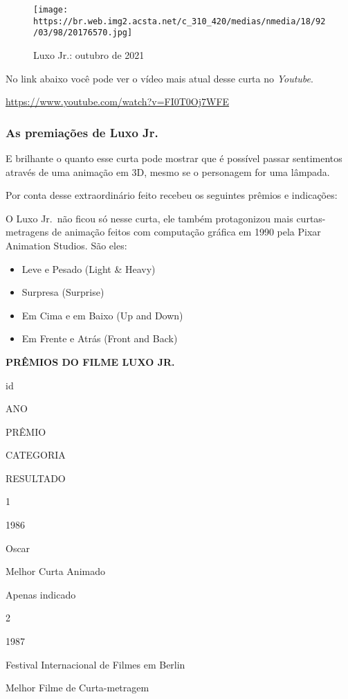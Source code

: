 \documentclass[
]{article}
\providecommand{\tightlist}{%
  \setlength{\itemsep}{0pt}\setlength{\parskip}{0pt}}
\begin{document}
\begin{figure}
\centering
\texttt{[image: https://br.web.img2.acsta.net/c\_310\_420/medias/nmedia/18/92/03/98/20176570.jpg]}
\caption{Luxo Jr.: outubro de 2021}
\end{figure}

No link abaixo você pode ver o vídeo mais atual desse curta no
\emph{Youtube}.

\url{https://www.youtube.com/watch?v=FI0T0Oj7WFE}

\hypertarget{as-premiauxe7uxf5es-de-luxo-jr.}{%
\subsubsection{As premiações de Luxo
Jr.~}\label{as-premiauxe7uxf5es-de-luxo-jr.}}

E brilhante o quanto esse curta pode mostrar que é possível passar
sentimentos através de uma animação em 3D, mesmo se o personagem for uma
lâmpada.

Por conta desse extraordinário feito recebeu os seguintes prêmios e
indicações:

O Luxo Jr.~não ficou só nesse curta, ele também protagonizou mais
curtas-metragens de animação feitos com computação gráfica em 1990 pela
Pixar Animation Studios. São eles:

\begin{itemize}
\tightlist
\item
  Leve e Pesado (Light \& Heavy)
\item
  Surpresa (Surprise)
\item
  Em Cima e em Baixo (Up and Down)
\item
  Em Frente e Atrás (Front and Back)
\end{itemize}

\textbf{PRÊMIOS DO FILME LUXO JR.}

id

ANO

PRÊMIO

CATEGORIA

RESULTADO

{1}

1986

Oscar

Melhor Curta Animado

Apenas indicado

{2}

1987

Festival Internacional de Filmes em Berlin

Melhor Filme de Curta-metragem
\end{document}
